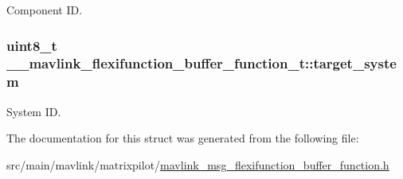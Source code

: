 Component I\+D. 

\hypertarget{struct____mavlink__flexifunction__buffer__function__t_a0f70169da8a7515a2dfebf2999bde198}{
\subsubsection[{target\+\_\+system}]{\setlength{\rightskip}{0pt plus 5cm}uint8\+\_\+t \+\_\+\+\_\+mavlink\+\_\+flexifunction\+\_\+buffer\+\_\+function\+\_\+t\+::target\+\_\+system}}\label{struct____mavlink__flexifunction__buffer__function__t_a0f70169da8a7515a2dfebf2999bde198}


System I\+D. 



The documentation for this struct was generated from the following file\+:\begin{DoxyCompactItemize}
\item 
src/main/mavlink/matrixpilot/\hyperlink{mavlink__msg__flexifunction__buffer__function_8h}{mavlink\+\_\+msg\+\_\+flexifunction\+\_\+buffer\+\_\+function.\+h}\end{DoxyCompactItemize}
